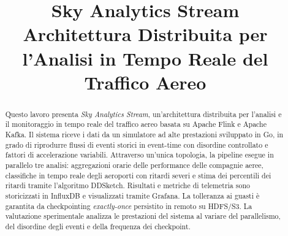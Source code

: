 \documentclass[conference]{IEEEtran}
\begin{document}
\setlength{\textfloatsep}{8pt plus 2pt minus 2pt}
\setlength{\intextsep}{8pt plus 2pt minus 2pt}

\title{Sky Analytics Stream \\ \vspace{0.15cm} \large Architettura Distribuita per l'Analisi in Tempo Reale del Traffico Aereo}

\author{
    \and
}

%

\maketitle
\thispagestyle{headings}


\begin{abstract}
Questo lavoro presenta \textit{Sky Analytics Stream}, un'architettura distribuita per l'analisi e il monitoraggio in tempo reale del traffico aereo basata su Apache Flink e Apache Kafka. Il sistema riceve i dati da un simulatore ad alte prestazioni sviluppato in Go, in grado di riprodurre flussi di eventi storici in event-time con disordine controllato e fattori di accelerazione variabili. Attraverso un'unica topologia, la pipeline esegue in parallelo tre analisi: aggregazioni orarie delle performance delle compagnie aeree, classifiche in tempo reale degli aeroporti con ritardi severi e stima dei percentili dei ritardi tramite l'algoritmo DDSketch. Risultati e metriche di telemetria sono storicizzati in InfluxDB e visualizzati tramite Grafana. La tolleranza ai guasti è garantita da checkpointing \emph{exactly-once} persistito in remoto su HDFS/S3. La valutazione sperimentale analizza le prestazioni del sistema al variare del parallelismo, del disordine degli eventi e della frequenza dei checkpoint.
\end{abstract}
\end{document}
